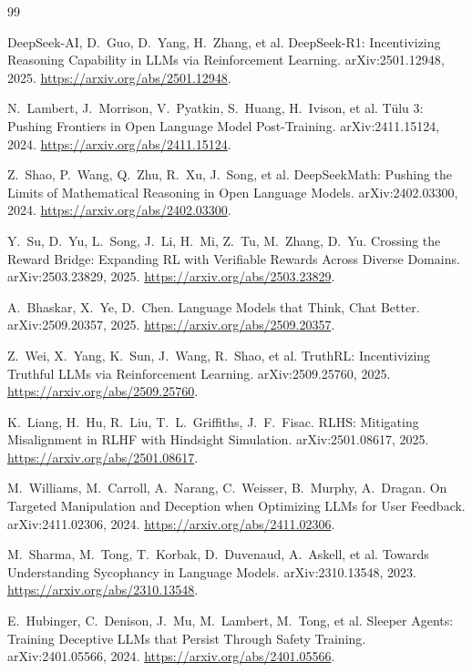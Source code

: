 \documentclass[11pt]{article}
\theoremstyle{plain}
\theoremstyle{definition}
\theoremstyle{remark}
\begin{document}
\begin{thebibliography}{99}
\setlength{\itemsep}{2pt}

DeepSeek-AI, D.~Guo, D.~Yang, H.~Zhang, et al.
\newblock DeepSeek-R1: Incentivizing Reasoning Capability in LLMs via Reinforcement Learning.
\newblock arXiv:2501.12948, 2025. \url{https://arxiv.org/abs/2501.12948}.

N.~Lambert, J.~Morrison, V.~Pyatkin, S.~Huang, H.~Ivison, et al.
\newblock T\"ulu 3: Pushing Frontiers in Open Language Model Post-Training.
\newblock arXiv:2411.15124, 2024. \url{https://arxiv.org/abs/2411.15124}.

Z.~Shao, P.~Wang, Q.~Zhu, R.~Xu, J.~Song, et al.
\newblock DeepSeekMath: Pushing the Limits of Mathematical Reasoning in Open Language Models.
\newblock arXiv:2402.03300, 2024. \url{https://arxiv.org/abs/2402.03300}.

Y.~Su, D.~Yu, L.~Song, J.~Li, H.~Mi, Z.~Tu, M.~Zhang, D.~Yu.
\newblock Crossing the Reward Bridge: Expanding RL with Verifiable Rewards Across Diverse Domains.
\newblock arXiv:2503.23829, 2025. \url{https://arxiv.org/abs/2503.23829}.

A.~Bhaskar, X.~Ye, D.~Chen.
\newblock Language Models that Think, Chat Better.
\newblock arXiv:2509.20357, 2025. \url{https://arxiv.org/abs/2509.20357}.

Z.~Wei, X.~Yang, K.~Sun, J.~Wang, R.~Shao, et al.
\newblock TruthRL: Incentivizing Truthful LLMs via Reinforcement Learning.
\newblock arXiv:2509.25760, 2025. \url{https://arxiv.org/abs/2509.25760}.

K.~Liang, H.~Hu, R.~Liu, T.~L.~Griffiths, J.~F.~Fisac.
\newblock RLHS: Mitigating Misalignment in RLHF with Hindsight Simulation.
\newblock arXiv:2501.08617, 2025. \url{https://arxiv.org/abs/2501.08617}.

M.~Williams, M.~Carroll, A.~Narang, C.~Weisser, B.~Murphy, A.~Dragan.
\newblock On Targeted Manipulation and Deception when Optimizing LLMs for User Feedback.
\newblock arXiv:2411.02306, 2024. \url{https://arxiv.org/abs/2411.02306}.

M.~Sharma, M.~Tong, T.~Korbak, D.~Duvenaud, A.~Askell, et al.
\newblock Towards Understanding Sycophancy in Language Models.
\newblock arXiv:2310.13548, 2023. \url{https://arxiv.org/abs/2310.13548}.

E.~Hubinger, C.~Denison, J.~Mu, M.~Lambert, M.~Tong, et al.
\newblock Sleeper Agents: Training Deceptive LLMs that Persist Through Safety Training.
\newblock arXiv:2401.05566, 2024. \url{https://arxiv.org/abs/2401.05566}.


\end{thebibliography}
\end{document}
